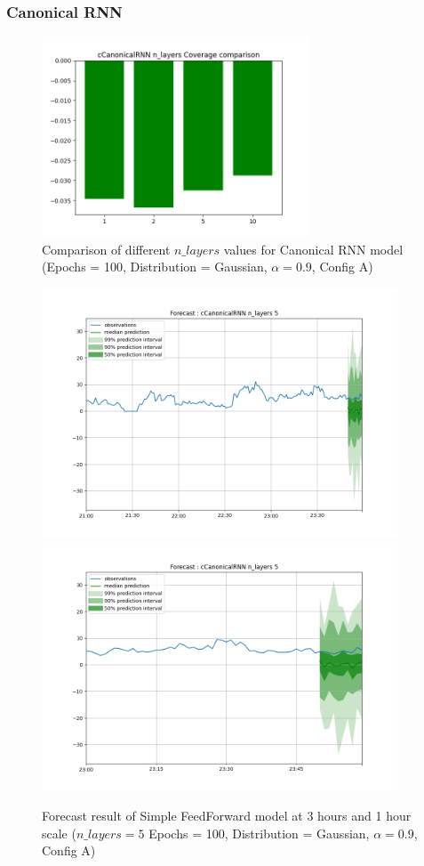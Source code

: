 \subsubsection{Canonical RNN} \label{comp_canonicalrnn}

\begin{figure}[H]
    \centering
    \includegraphics[width=300px]{plots/hist/a/cCanonicalRNN/n_layers/Coverage.png}
    \caption{Comparison of different $n\_layers$ values for Canonical RNN model (Epochs = 100, Distribution = Gaussian, $\alpha = 0.9$, Config A)}
    \label{fig:comp_canonicalrnn}
\end{figure}

\begin{figure}[H]
    \centering
    \includegraphics[width=400px]{plots/forecast/a/cCanonicalRNN/n_layers/5/180.png}
    \includegraphics[width=400px]{plots/forecast/a/cCanonicalRNN/n_layers/5/60.png}
    \caption{Forecast result of Simple FeedForward model at 3 hours and 1 hour scale ($n\_layers = 5$ Epochs = 100, Distribution = Gaussian, $\alpha = 0.9$, Config A)}
    \label{fig:canonicalrnn}
\end{figure}


